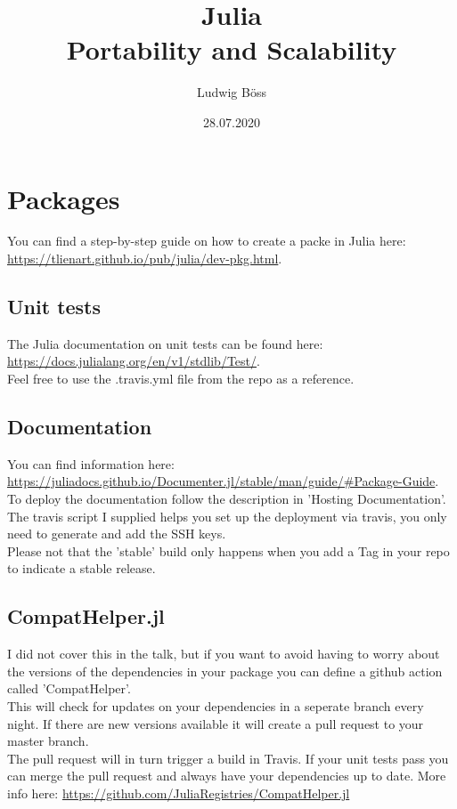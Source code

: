 \documentclass[10pt,a4paper]{article}
\title{Julia\\Portability and Scalability}
\date{28.07.2020}
\author{Ludwig Böss}
\begin{document}
\maketitle

\section{Packages}

You can find a step-by-step guide on how to create a packe in Julia here: \url{https://tlienart.github.io/pub/julia/dev-pkg.html}.

\subsection{Unit tests}

The Julia documentation on unit tests can be found here: \url{https://docs.julialang.org/en/v1/stdlib/Test/}.\\
Feel free to use the .travis.yml file from the repo as a reference.

\subsection{Documentation}

You can find information here: \url{https://juliadocs.github.io/Documenter.jl/stable/man/guide/#Package-Guide}.\\
To deploy the documentation follow the description in 'Hosting Documentation'.\\
The travis script I supplied helps you set up the deployment via travis, you only need to generate and add the SSH keys.\\
Please not that the 'stable' build only happens when you add a Tag in your repo to indicate a stable release.

\subsection{CompatHelper.jl}

I did not cover this in the talk, but if you want to avoid having to worry about the versions of the dependencies in your package you can define a github action called 'CompatHelper'.\\
This will check for updates on your dependencies in a seperate branch every night. If there are new versions available it will create a pull request to your master branch.\\
The pull request will in turn trigger a build in Travis. If your unit tests pass you can merge the pull request and always have your dependencies up to date.
More info here: \url{https://github.com/JuliaRegistries/CompatHelper.jl}
\end{document}
